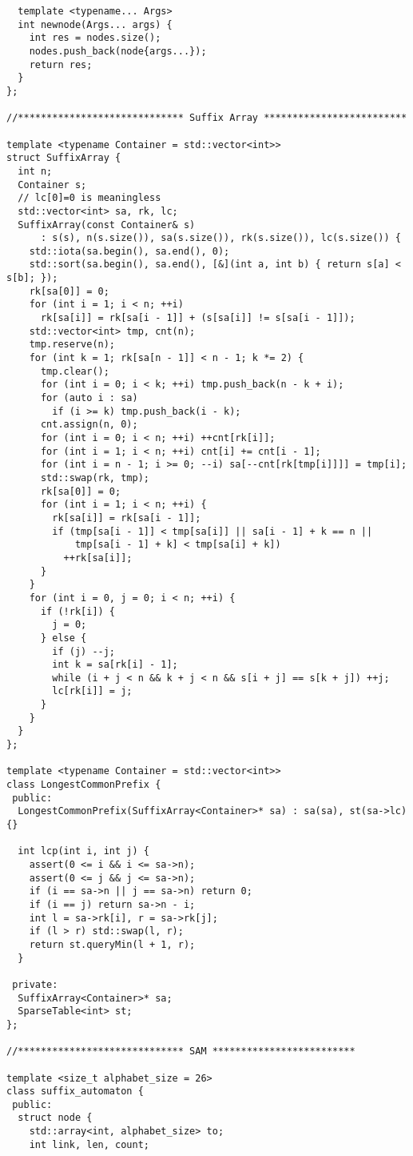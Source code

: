\documentclass{article}
\begin{document}
\begin{multicols}{2}
\begin{lstlisting}
  template <typename... Args>
  int newnode(Args... args) {
    int res = nodes.size();
    nodes.push_back(node{args...});
    return res;
  }
};

//***************************** Suffix Array *************************

template <typename Container = std::vector<int>>
struct SuffixArray {
  int n;
  Container s;
  // lc[0]=0 is meaningless
  std::vector<int> sa, rk, lc;
  SuffixArray(const Container& s)
      : s(s), n(s.size()), sa(s.size()), rk(s.size()), lc(s.size()) {
    std::iota(sa.begin(), sa.end(), 0);
    std::sort(sa.begin(), sa.end(), [&](int a, int b) { return s[a] < s[b]; });
    rk[sa[0]] = 0;
    for (int i = 1; i < n; ++i)
      rk[sa[i]] = rk[sa[i - 1]] + (s[sa[i]] != s[sa[i - 1]]);
    std::vector<int> tmp, cnt(n);
    tmp.reserve(n);
    for (int k = 1; rk[sa[n - 1]] < n - 1; k *= 2) {
      tmp.clear();
      for (int i = 0; i < k; ++i) tmp.push_back(n - k + i);
      for (auto i : sa)
        if (i >= k) tmp.push_back(i - k);
      cnt.assign(n, 0);
      for (int i = 0; i < n; ++i) ++cnt[rk[i]];
      for (int i = 1; i < n; ++i) cnt[i] += cnt[i - 1];
      for (int i = n - 1; i >= 0; --i) sa[--cnt[rk[tmp[i]]]] = tmp[i];
      std::swap(rk, tmp);
      rk[sa[0]] = 0;
      for (int i = 1; i < n; ++i) {
        rk[sa[i]] = rk[sa[i - 1]];
        if (tmp[sa[i - 1]] < tmp[sa[i]] || sa[i - 1] + k == n ||
            tmp[sa[i - 1] + k] < tmp[sa[i] + k])
          ++rk[sa[i]];
      }
    }
    for (int i = 0, j = 0; i < n; ++i) {
      if (!rk[i]) {
        j = 0;
      } else {
        if (j) --j;
        int k = sa[rk[i] - 1];
        while (i + j < n && k + j < n && s[i + j] == s[k + j]) ++j;
        lc[rk[i]] = j;
      }
    }
  }
};

template <typename Container = std::vector<int>>
class LongestCommonPrefix {
 public:
  LongestCommonPrefix(SuffixArray<Container>* sa) : sa(sa), st(sa->lc) {}

  int lcp(int i, int j) {
    assert(0 <= i && i <= sa->n);
    assert(0 <= j && j <= sa->n);
    if (i == sa->n || j == sa->n) return 0;
    if (i == j) return sa->n - i;
    int l = sa->rk[i], r = sa->rk[j];
    if (l > r) std::swap(l, r);
    return st.queryMin(l + 1, r);
  }

 private:
  SuffixArray<Container>* sa;
  SparseTable<int> st;
};

//***************************** SAM *************************

template <size_t alphabet_size = 26>
class suffix_automaton {
 public:
  struct node {
    std::array<int, alphabet_size> to;
    int link, len, count;


\end{lstlisting}
\end{multicols}
\end{document}
